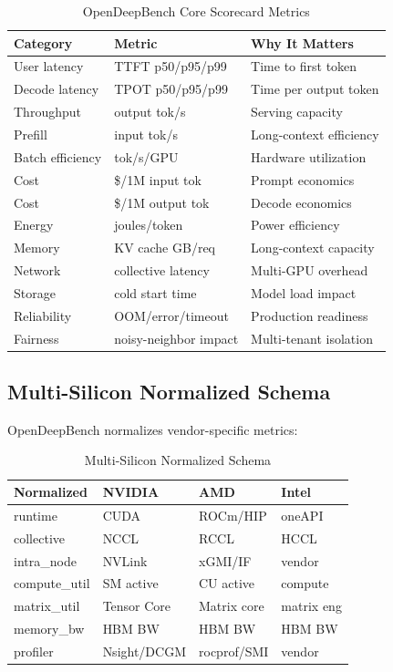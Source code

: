 \documentclass[conference,10pt]{IEEEtran}
\begin{document}
\begin{table}[!htbp]
\caption{OpenDeepBench Core Scorecard Metrics}
\label{tab:scorecard}
\centering\footnotesize
\begin{tabular}{@{}llp{3cm}@{}}
\toprule
\textbf{Category} & \textbf{Metric} & \textbf{Why It Matters} \\
\midrule
User latency & TTFT p50/p95/p99 & Time to first token \\
Decode latency & TPOT p50/p95/p99 & Time per output token \\
Throughput & output tok/s & Serving capacity \\
Prefill & input tok/s & Long-context efficiency \\
Batch efficiency & tok/s/GPU & Hardware utilization \\
Cost & \$/1M input tok & Prompt economics \\
Cost & \$/1M output tok & Decode economics \\
Energy & joules/token & Power efficiency \\
Memory & KV cache GB/req & Long-context capacity \\
Network & collective latency & Multi-GPU overhead \\
Storage & cold start time & Model load impact \\
Reliability & OOM/error/timeout & Production readiness \\
Fairness & noisy-neighbor impact & Multi-tenant isolation \\
\bottomrule
\end{tabular}
\end{table}

\subsection{Multi-Silicon Normalized Schema}

OpenDeepBench normalizes vendor-specific metrics:

\begin{table}[!htbp]
\caption{Multi-Silicon Normalized Schema}
\label{tab:normalized}
\centering\footnotesize
\begin{tabular}{@{}llll@{}}
\toprule
\textbf{Normalized} & \textbf{NVIDIA} & \textbf{AMD} & \textbf{Intel} \\
\midrule
runtime & CUDA & ROCm/HIP & oneAPI \\
collective & NCCL & RCCL & HCCL \\
intra\_node & NVLink & xGMI/IF & vendor \\
compute\_util & SM active & CU active & compute \\
matrix\_util & Tensor Core & Matrix core & matrix eng \\
memory\_bw & HBM BW & HBM BW & HBM BW \\
profiler & Nsight/DCGM & rocprof/SMI & vendor \\
\bottomrule
\end{tabular}
\end{table}
\end{document}
